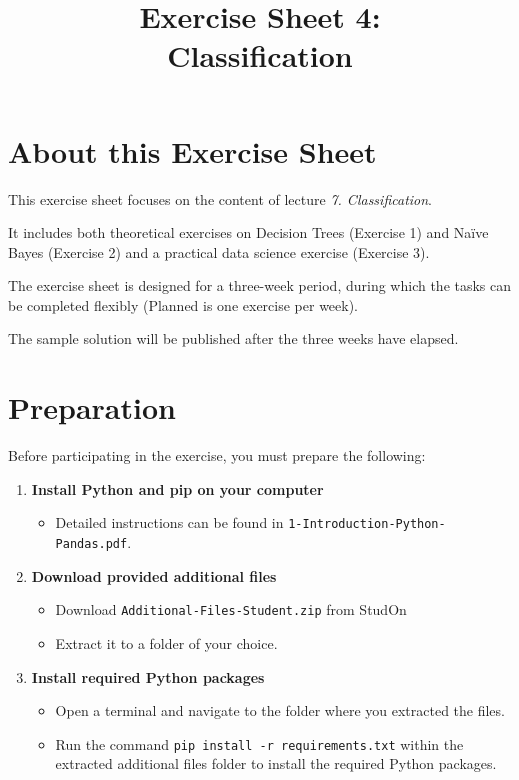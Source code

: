 \documentclass[
english,
smallborders
]{i6prcsht}
\begin{document}
\title{Exercise Sheet 4: \\ Classification}
\maketitle
\vspace*{-2cm}

\section*{About this Exercise Sheet}

This exercise sheet focuses on the content of lecture \textit{7. Classification}.

It includes both theoretical exercises on Decision Trees (Exercise 1) and Naïve Bayes (Exercise 2) and a practical data science exercise (Exercise 3).

The exercise sheet is designed for a three-week period, during which the tasks can be completed flexibly (Planned is one exercise per week).

The sample solution will be published after the three weeks have elapsed.

\section*{Preparation}

Before participating in the exercise, you must prepare the following:

\begin{enumerate}	
	\item \textbf{Install Python and pip on your computer}
	      
	      \begin{itemize}	
		      \item Detailed instructions can be found in \texttt{1-Introduction-Python-Pandas.pdf}.
	      \end{itemize}
	      
	\item \textbf{Download provided additional files}
	      
	      \begin{itemize}	
		      \item Download \texttt{Additional-Files-Student.zip} from StudOn
		      \item Extract it to a folder of your choice.
	      \end{itemize}
	      
	\item \textbf{Install required Python packages}
	      
	      \begin{itemize}	
		      \item Open a terminal and navigate to the folder where you extracted the files.
		      \item Run the command \texttt{pip install -r requirements.txt} within the extracted additional files folder to install the required Python packages.
	      \end{itemize}
	      
	      
\end{enumerate}
\end{document}
